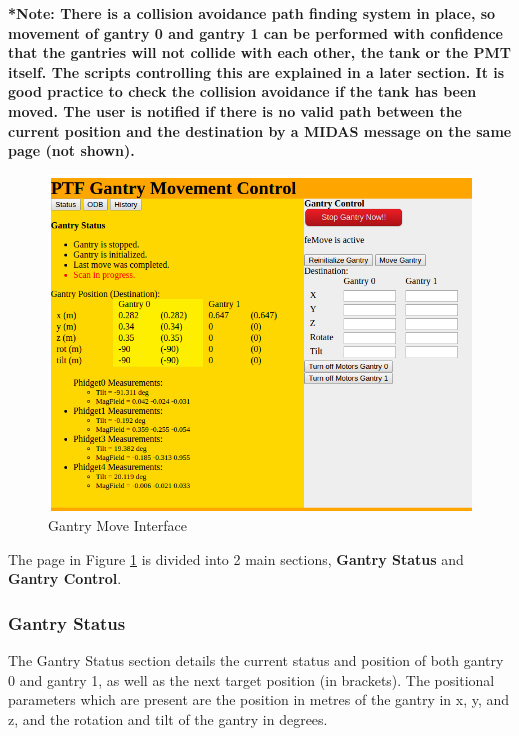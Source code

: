 \documentclass[twoside,letterpaper]{refart}
\begin{document}
\textbf{*Note: There is a collision avoidance path finding system in place, so movement of gantry 0 and gantry 1 can be performed with confidence that the gantries will not collide with each other, the tank or the PMT itself. The scripts controlling this are explained in a later section. It is good practice to check the collision avoidance if the tank has been moved. The user is notified if there is no valid path between the current position and the destination by a MIDAS message on the same page (not shown).}

\FloatBarrier

\begin{figure}[!htpb] 
	
	\centering	
	\includegraphics[scale=0.35]{images/gantryMove}
	\caption{Gantry Move Interface}
	\label{gMove}
\end{figure}

\FloatBarrier

The page in Figure \ref{gMove} is divided into 2 main sections, \textbf{Gantry Status} and \textbf{Gantry Control}. 

\subsubsection{Gantry Status}
The Gantry Status section details the current status and position of both gantry 0 and gantry 1, as well as the next target position (in brackets).  The positional parameters which are present are the position in metres of the gantry in x, y, and z, and the rotation and tilt of the gantry in degrees.
\end{document}

